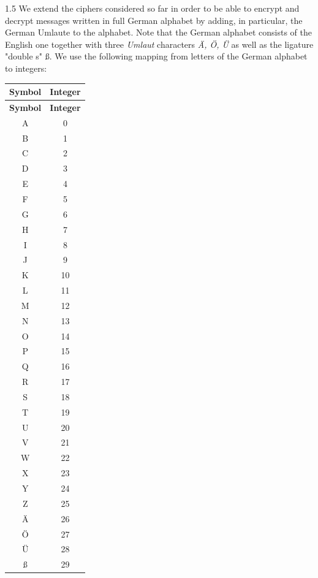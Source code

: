 \documentclass[]{scrartcl}
\newcounter{exercise}
\newcounter{qid}[section]
\newcommand{\exerciseprefix}{prefix}
\newcommand{\questiontitle}{Questions}
\newcommand{\blockid}{B2}
\newcommand{\exname}{}
\begin{document}
\renewcommand{\exerciseprefix}{PS-\blockid{}-E\theexercise: \exname-Q\theqid}
\renewcommand{\questiontitle}{\exerciseprefix{}: Extending the alphabet}
\begin{exercisebox}{1.5}
We extend the ciphers considered so far in order to be able to encrypt and decrypt messages written in full German alphabet by adding, in particular, the German Umlaute to the alphabet. Note that the German alphabet consists of the English one together with three \emph{Umlaut} characters \emph{Ä, Ö, Ü} as well as the ligature "double s" ß. We use the following mapping from letters of the German alphabet to integers:
\begin{longtable}{|c|c|}
\hline
\textbf{Symbol} & \textbf{Integer} \\ \hline
\endfirsthead
\hline
\textbf{Symbol} & \textbf{Integer} \\ \hline
\endhead
A & 0 \\ \hline
B & 1 \\ \hline
C & 2 \\ \hline
D & 3 \\ \hline
E & 4 \\ \hline
F & 5 \\ \hline
G & 6 \\ \hline
H & 7 \\ \hline
I & 8 \\ \hline
J & 9 \\ \hline
K & 10 \\ \hline
L & 11 \\ \hline
M & 12 \\ \hline
N & 13 \\ \hline
O & 14 \\ \hline
P & 15 \\ \hline
Q & 16 \\ \hline
R & 17 \\ \hline
S & 18 \\ \hline
T & 19 \\ \hline
U & 20 \\ \hline
V & 21 \\ \hline
W & 22 \\ \hline
X & 23 \\ \hline
Y & 24 \\ \hline
Z & 25 \\ \hline
Ä & 26 \\ \hline
Ö & 27 \\ \hline
Ü & 28 \\ \hline
ß & 29 \\ \hline

\end{longtable}
\end{exercisebox}
\end{document}
